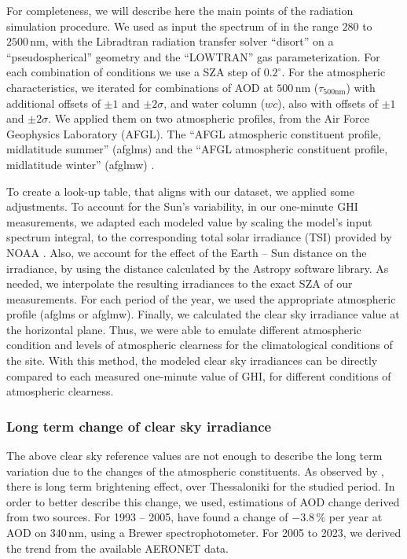 \documentclass[preprint, 3p,
authoryear]{elsarticle} %
\begin{document}
For completeness, we will describe here the main points of the radiation
simulation procedure. We used as input the spectrum of
\citet{Kurucz1994} in the range \(280\) to \(2500\,\text{nm}\), with the
Libradtran radiation transfer solver ``disort'' on a ``pseudospherical''
geometry and the ``LOWTRAN'' gas parameterization. For each combination
of conditions we use a SZA step of \(0.2^\circ\). For the atmospheric
characteristics, we iterated for combinations of AOD at
\(500\,\text{nm}\) (\(\tau_{500\text{nm}}\)) with additional offsets of
\(\pm1\) and \(\pm2\sigma\), and water column (\(wc\)), also with
offsets of \(\pm1\) and \(\pm2\sigma\). We applied them on two
atmospheric profiles, from the Air Force Geophysics Laboratory (AFGL).
The ``AFGL atmospheric constituent profile, midlatitude summer''
(afglms) and the ``AFGL atmospheric constituent profile, midlatitude
winter'' (afglmw) \citep{Anderson1986}.

To create a look-up table, that aligns with our dataset, we applied some
adjustments. To account for the Sun's variability, in our one-minute GHI
measurements, we adapted each modeled value by scaling the model's input
spectrum integral, to the corresponding total solar irradiance (TSI)
provided by NOAA \citep{Coddington2005}. Also, we account for the effect
of the Earth -- Sun distance on the irradiance, by using the distance
calculated by the Astropy \citep{AstropyCollaboration2022} software
library. As needed, we interpolate the resulting irradiances to the
exact SZA of our measurements. For each period of the year, we used the
appropriate atmospheric profile (afglms or afglmw). Finally, we
calculated the clear sky irradiance value at the horizontal plane. Thus,
we were able to emulate different atmospheric condition and levels of
atmospheric clearness for the climatological conditions of the site.
With this method, the modeled clear sky irradiances can be directly
compared to each measured one-minute value of GHI, for different
conditions of atmospheric clearness.

\hypertarget{long-term-change-of-clear-sky-irradiance}{%
\subsubsection{Long term change of clear sky
irradiance}\label{long-term-change-of-clear-sky-irradiance}}

The above clear sky reference values are not enough to describe the long
term variation due to the changes of the atmospheric constituents. As
observed by \citet{Natsis2023}, there is long term brightening effect,
over Thessaloniki for the studied period. In order to better describe
this change, we used, estimations of AOD change derived from two
sources. For 1993 -- 2005, \citet{Kazadzis2007} have found a change of
\(-3.8\,\%\) per year at AOD on \(340\,\text{nm}\), using a Brewer
spectrophotometer. For 2005 to 2023, we derived the trend from the
available AERONET data.
\end{document}
